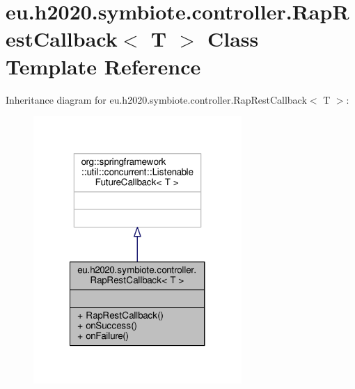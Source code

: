 \hypertarget{classeu_1_1h2020_1_1symbiote_1_1controller_1_1RapRestCallback}{}\section{eu.\+h2020.\+symbiote.\+controller.\+Rap\+Rest\+Callback$<$ T $>$ Class Template Reference}
\label{classeu_1_1h2020_1_1symbiote_1_1controller_1_1RapRestCallback}


Inheritance diagram for eu.\+h2020.\+symbiote.\+controller.\+Rap\+Rest\+Callback$<$ T $>$\+:\nopagebreak
\begin{figure}[H]
\begin{center}
\leavevmode
\includegraphics[width=224pt]{classeu_1_1h2020_1_1symbiote_1_1controller_1_1RapRestCallback__inherit__graph}
\end{center}
\end{figure}


